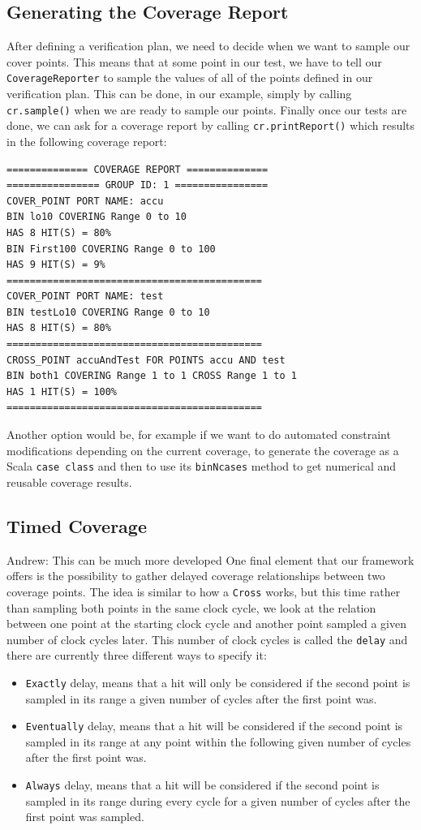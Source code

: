 \documentclass[conference]{IEEEtran}
\newcommand{\andrew}[1]{{\color{red} Andrew: #1}}
\begin{document}
\subsection{Generating the Coverage Report}
After defining a verification plan, we need to decide when we want to sample our cover points. This means that at some point in our test, we have to tell our \texttt{CoverageReporter} to sample the values of all of the points defined in our verification plan. This can be done, in our example, simply by calling \texttt{cr.sample()} when we are ready to sample our points. Finally once our tests are done, we can ask for a coverage report by calling \texttt{cr.printReport()} which results in the following coverage report: 
\begin{verbatim}
============== COVERAGE REPORT ==============
================ GROUP ID: 1 ================
COVER_POINT PORT NAME: accu
BIN lo10 COVERING Range 0 to 10 
HAS 8 HIT(S) = 80%
BIN First100 COVERING Range 0 to 100 
HAS 9 HIT(S) = 9%
============================================
COVER_POINT PORT NAME: test
BIN testLo10 COVERING Range 0 to 10 
HAS 8 HIT(S) = 80%
============================================
CROSS_POINT accuAndTest FOR POINTS accu AND test
BIN both1 COVERING Range 1 to 1 CROSS Range 1 to 1 
HAS 1 HIT(S) = 100%
============================================
\end{verbatim}
Another option would be, for example if we want to do automated constraint modifications depending on the current coverage, to generate the coverage as a Scala \texttt{case class} and then to use its \texttt{binNcases} method to get numerical and reusable coverage results.  
  
\subsection{Timed Coverage}
\andrew{This can be much more developed}
One final element that our framework offers is the possibility to gather delayed coverage relationships between two coverage points. The idea is similar to how a \texttt{Cross} works, but this time rather than sampling both points in the same clock cycle, we look at the relation between one point at the starting clock cycle and another point sampled a given number of clock cycles later. This number of clock cycles is called the \texttt{delay} and there are currently three different ways to specify it:  
\begin{itemize}
 \item \texttt{Exactly} delay, means that a hit will only be considered if the second point is sampled in its range a given number of cycles after the first point was.
 \item \texttt{Eventually} delay, means that a hit will be considered if the second point is sampled in its range at any point within the following given number of cycles after the first point was.  
 \item \texttt{Always} delay, means that a hit will be considered if the second point is sampled in its range during every cycle for a given number of cycles after the first point was sampled.
\end{itemize}  
\end{document}

